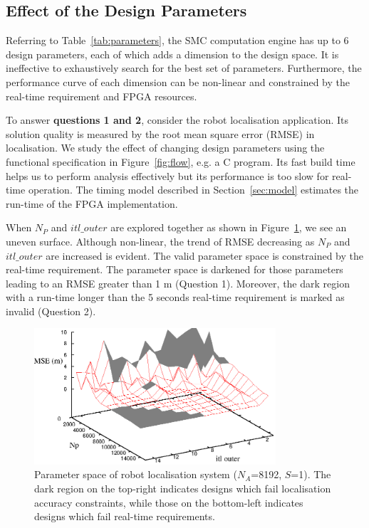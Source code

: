 \subsection{Effect of the Design Parameters}
\label{sec:parameters}

Referring to Table~\ref{tab:parameters}, the SMC computation engine has up to 6 design parameters, each of which adds a dimension to the design space.
It is ineffective to exhaustively search for the best set of parameters.
Furthermore, the performance curve of each dimension can be non-linear and constrained by the real-time requirement and FPGA resources.

To answer \textbf{questions 1 and 2}, consider the robot localisation application.
Its solution quality is measured by the root mean square error (RMSE) in localisation.
We study the effect of changing design parameters using the functional specification in Figure~\ref{fig:flow}, e.g. a C program.
Its fast build time helps us to perform analysis effectively but its performance is too slow for real-time operation.
The timing model described in Section~\ref{sec:model} estimates the run-time of the FPGA implementation.

When $N_P$ and $itl\_outer$ are explored together as shown in Figure~\ref{fig:mcl_2d}, we see an uneven surface.
Although non-linear, the trend of  RMSE decreasing as $N_P$ and $itl\_outer$ are increased is evident.
The valid parameter space is constrained by the real-time requirement.
The parameter space is darkened for those parameters leading to an RMSE greater than 1 m (Question 1).
Moreover, the dark region with a run-time longer than the 5 seconds real-time requirement is marked as invalid (Question 2).

\begin{figure}[t!]
\begin{center}
\includegraphics[width=0.8\textwidth]{design_flow/figures/fig_mcl_2d}
\end{center}
\caption{Parameter space of robot localisation system ($N_A$=8192, $S$=1). The dark region on the top-right indicates designs which fail localisation accuracy constraints, while those on the bottom-left indicates designs which fail real-time requirements.}
\label{fig:mcl_2d}
\end{figure}

